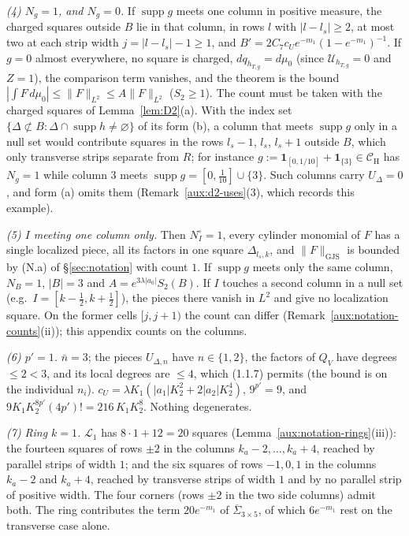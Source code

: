\documentclass[11pt,a4paper]{article}
\theoremstyle{plain}
\theoremstyle{definition}
\theoremstyle{plain}
\theoremstyle{definition}
\newcommand{\CH}{\mathcal{C}_{\mathrm H}}
\DeclareMathOperator{\supp}{supp}
\newcommand{\GJS}[1]{\lVert #1\rVert_{\mathrm{GJS}}}   %
\newcommand{\Uc}{\mathcal U}
\newcommand{\dmu}{d\mu_0}
\begin{document}
\emph{(4) $N_g=1$, and $N_g=0$.} If $\supp g$ meets one column in positive measure, the charged
squares outside $B$ lie in that column, in rows $l$ with $|l-l_s|\ge2$, at most two at each
strip width $j=|l-l_s|-1\ge1$, and
$B'=2C_7c_Ue^{-m_1}(1-e^{-m_1})^{-1}$. If $g=0$ almost everywhere, no square is charged,
$dq_{h_{T,g}}=\dmu$ (since $\Uc_{h_{T,g}}=0$ and $Z=1$), the comparison term vanishes, and the
theorem is the bound $|\int F\,d\mu_0|\le\|F\|_{L^2}\le A\|F\|_{L^2}$ ($S_2\ge1$). The count
must be taken with the charged squares of Lemma~\ref{lem:D2}(a). With the index set
$\{\Delta\not\subset B:\Delta\cap\supp h\ne\varnothing\}$ of its form (b), a column that meets
$\supp g$ only in a null set would contribute squares in the rows $l_s-1$, $l_s$, $l_s+1$
outside $B$, which only transverse strips separate from $R$; for instance
$g:=\mathbf 1_{[0,1/10]}+\mathbf 1_{\{3\}}\in\CH$ has $N_g=1$ while column $3$ meets
$\supp g=[0,\frac1{10}]\cup\{3\}$. Such columns carry $U_\Delta=0$, and form (a) omits them
(Remark~\ref{aux:d2-uses}(3), which records this example).

\emph{(5) $I$ meeting one column only.} Then $N^\square_I=1$, every cylinder monomial of $F$ has
a single localized piece, all its factors in one square $\Delta_{l_s,k}$, and
$\GJS F$ is bounded by (N.a) of \S\ref{sec:notation} with count $1$. If $\supp g$ meets only the
same column, $N_B=1$, $|B|=3$ and $A=e^{3\lambda|a_0|}S_2(B)$. If $I$ touches a second column in
a null set (e.g.\ $I=[k-\frac12,k+\frac12]$), the pieces there vanish in $L^2$ and give no
localization square. On the former cells $[j,j+1)$ the count can differ
(Remark~\ref{aux:notation-counts}(ii)); this appendix counts on the columns.

\emph{(6) $p'=1$.} $\bar n=3$; the pieces $U_{\Delta,n}$ have $n\in\{1,2\}$, the factors of $Q_V$
have degrees $\le2<3$, and its local degrees are $\le4$, which (1.1.7) permits (the bound is on
the individual $n_i$). $c_U=\lambda K_1(|a_1|K_2^2+2|a_2|K_2^4)$, $9^{p'}=9$, and
$9K_1K_2^{8p'}(4p')!=216\,K_1K_2^8$. Nothing degenerates.

\emph{(7) Ring $k=1$.} $\mathcal L_1$ has $8\cdot1+12=20$ squares
(Lemma~\ref{aux:notation-rings}(iii)): the fourteen squares of rows $\pm2$ in the columns
$k_a-2,\dots,k_a+4$, reached by parallel strips of width $1$; and the six squares of rows
$-1,0,1$ in the columns $k_a-2$ and $k_a+4$, reached by transverse strips of width $1$ and by no
parallel strip of positive width. The four corners (rows $\pm2$ in the two side columns) admit
both. The ring contributes the term $20e^{-m_1}$ of $\overline\Sigma_{3\times5}$, of which
$6e^{-m_1}$ rest on the transverse case alone.
\end{document}
